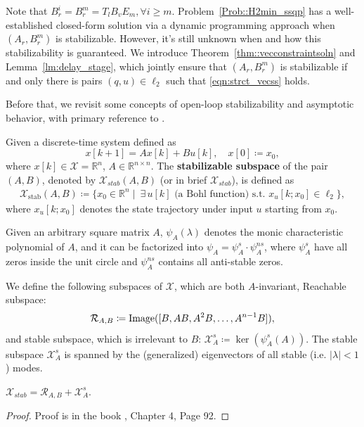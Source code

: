 Note that \(B_r^i = B_r^m = T_l B_v E_m, \forall i \geq m\).
Problem~\ref{Prob::H2min_ssqp} has a well-established closed-form solution via a dynamic programming approach when \((A_r, B_r^m)\) is stabilizable. 
However, it's still unknown when and how this stabilizability is guaranteed. We introduce Theorem~\ref{thm::vecconstraintsoln} and Lemma~\ref{lm:delay_stage}, which jointly ensure that \((A_r, B_r^m)\) is stabilizable if and only there is pairs \((q,u) \in \ell_2\) such that \eqref{eqn:strct_vecss} holds.

Before that, we revisit some concepts of open-loop stabilizability and asymptotic behavior, with primary reference to \cite{trentelman2012control}.
\begin{defn}
Given a discrete-time system defined as
\[
x[k+1] = A x[k] + B u[k], \quad x[0] \coloneqq x_0,
\]
where \( x[k] \in \mathcal{X} = \mathbb{R}^n \), \( A \in \mathbb{R}^{n \times n}\).
The \textbf{stabilizable subspace} of the pair \( (A, B) \), denoted by \(\mathcal{X}_{stab}(A, B) \) (or in brief \(\mathcal{X}_{stab}\)), is defined as
\begin{equation*}
\begin{aligned}
\mathcal{X}_{\mathrm{stab}}(A, B) \coloneqq \bigl\{ x_0 \in \mathbb{R}^n \mid \ \exists\, u[k] \text{ (a Bohl function) s.t. }
 x_u[k; x_0] \in \ell_2 \bigr\},
\end{aligned}
\end{equation*}
where \( x_u[k; x_0] \) denotes the state trajectory under input \( u \) starting from \(x_0\).
\end{defn}

Given an arbitrary square matrix \(A\), \(\psi_A(\lambda)\) denotes the monic characteristic polynomial of \(A\), and it can be factorized into \(\psi_A = \psi_A^s \cdot \psi_A^{ns}\), where \(\psi_A^s\) have all zeros inside the unit circle and \(\psi_A^{ns}\) contains all anti-stable zeros.

We define the following subspaces of \(\mathcal{X}\), which are both \(A\)-invariant,
Reachable subspace:
\[\mathcal{R}_{A,B} \coloneqq {\mathrm{Image}}([B,AB,A^2 B,\hdots, A^{n-1} B]),\]
and stable subspace, which is irrelevant to \(B\): \(\mathcal{X}_A^s \coloneqq \ker(\psi_A^s(A))\).
The stable subspace \(\mathcal{X}_A^s\) is spanned by the (generalized) eigenvectors of all stable (i.e. $|\lambda|<1$) modes.
\begin{lemma}
    \(\mathcal{X}_{stab} = \mathcal{R}_{A,B} + \mathcal{X}_A^s\).
\end{lemma}
\begin{proof}
    Proof is in the book \cite{trentelman2012control}, Chapter 4, Page 92.
\end{proof}

